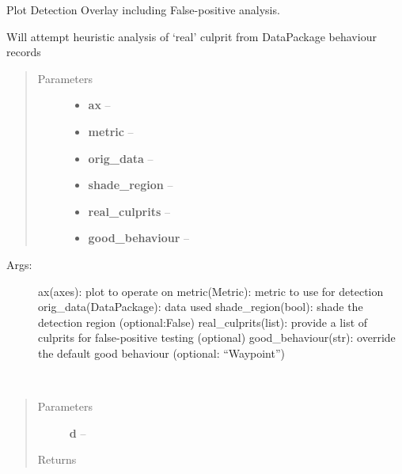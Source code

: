 \documentclass[letterpaper,10pt,english]{sphinxmanual}
\begin{document}
\begin{fulllineitems}
\label{index:bounos.plot_detections}
Plot Detection Overlay including False-positive analysis.

Will attempt heuristic analysis of `real' culprit from DataPackage behaviour records
\begin{quote}\begin{description}
\item[{Parameters}] \leavevmode\begin{itemize}
\item {} 
\textbf{ax} -- 

\item {} 
\textbf{metric} -- 

\item {} 
\textbf{orig\_data} -- 

\item {} 
\textbf{shade\_region} -- 

\item {} 
\textbf{real\_culprits} -- 

\item {} 
\textbf{good\_behaviour} -- 

\end{itemize}

\end{description}\end{quote}
\begin{description}
\item[{Args:}] \leavevmode
ax(axes): plot to operate on
metric(Metric): metric to use for detection
orig\_data(DataPackage): data used
shade\_region(bool): shade the detection region (optional:False)
real\_culprits(list): provide a list of culprits for false-positive testing (optional)
good\_behaviour(str): override the default good behaviour (optional: ``Waypoint'')

\end{description}

\end{fulllineitems}


\begin{fulllineitems}
\label{index:bounos.print_analysis}~\begin{quote}\begin{description}
\item[{Parameters}] \leavevmode
\textbf{d} -- 

\item[{Returns}] \leavevmode


\end{description}\end{quote}

\end{fulllineitems}
\end{document}
